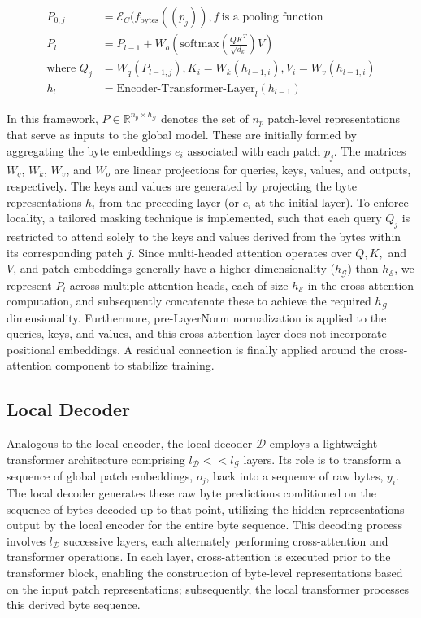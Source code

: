 \begin{align}
P_{0,j} &= \mathcal{E}_{C}(f_\text{bytes}((p_j)), f~ \text{is a pooling function} \\
P_l &= P_{l-1} + W_o\left(\text{softmax}\left(\frac{QK^T}{\sqrt{d_k}}\right)V\right) \\
\text{where } Q_j &= W_q(P_{l-1,j}), K_i = W_k(h_{l-1,i}), V_i = W_v(h_{l-1,i}) \\
h_l &= \text{Encoder-Transformer-Layer}_l(h_{l-1})
\end{align}

In this framework, $P \in \mathbb{R}^{n_p \times h_{\mathcal{G}}}$ denotes the set of $n_p$ patch-level representations that serve as inputs to the global model. These are initially formed by aggregating the byte embeddings $e_i$ associated with each patch $p_j$. The matrices $W_q$, $W_k$, $W_v$, and $W_o$ are linear projections for queries, keys, values, and outputs, respectively. The keys and values are generated by projecting the byte representations $h_i$ from the preceding layer (or $e_i$ at the initial layer). To enforce locality, a tailored masking technique is implemented, such that each query $Q_j$ is restricted to attend solely to the keys and values derived from the bytes within its corresponding patch $j$. Since multi-headed attention operates over $Q, K,$ and $V$, and patch embeddings generally have a higher dimensionality ($h_{\mathcal{G}}$) than $h_{\mathcal{E}}$, we represent $P_l$ across multiple attention heads, each of size $h_{\mathcal{E}}$ in the cross-attention computation, and subsequently concatenate these to achieve the required $h_{\mathcal{G}}$ dimensionality. Furthermore, pre-LayerNorm normalization is applied to the queries, keys, and values, and this cross-attention layer does not incorporate positional embeddings. A residual connection is finally applied around the cross-attention component to stabilize training.

\subsection{Local Decoder} 

Analogous to the local encoder, the local decoder $\mathcal{D}$ employs a lightweight transformer architecture comprising $l_{\mathcal{D}} << l_{\mathcal{G}}$ layers. Its role is to transform a sequence of global patch embeddings, $o_j$, back into a sequence of raw bytes, $y_i$. The local decoder generates these raw byte predictions conditioned on the sequence of bytes decoded up to that point, utilizing the hidden representations output by the local encoder for the entire byte sequence. This decoding process involves $l_{\mathcal{D}}$ successive layers, each alternately performing cross-attention and transformer operations. In each layer, cross-attention is executed prior to the transformer block, enabling the construction of byte-level representations based on the input patch representations; subsequently, the local transformer processes this derived byte sequence.

